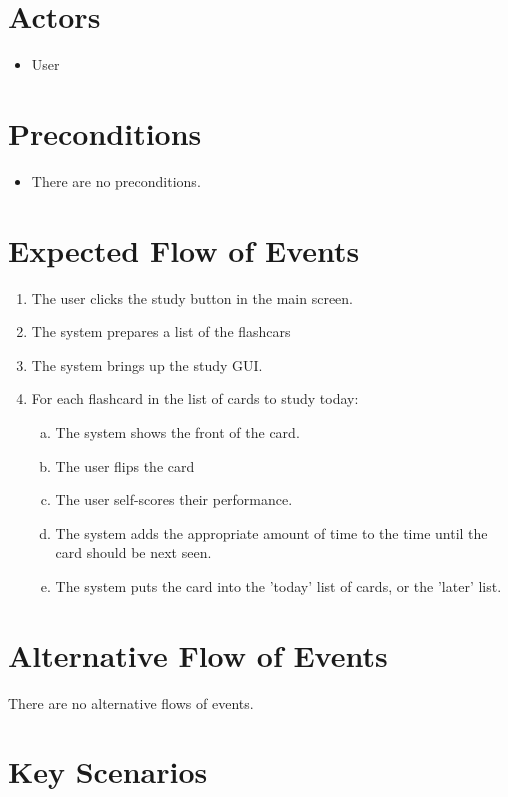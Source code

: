\documentclass{scrreprt}
\begin{document}
\section{Actors}
\begin{itemize}
    \item User
\end{itemize}

\section{Preconditions}
\begin{itemize}
    \item There are no preconditions.
\end{itemize}

\section{Expected Flow of Events}
\begin{enumerate}[1.]
    \item The user clicks the study button in the main screen.
    \item The system prepares a list of the flashcars
    \item The system brings up the study GUI.
    \item For each flashcard in the list of cards to study today:
    \begin{enumerate}[a.]
        \item The system shows the front of the card.
        \item The user flips the card
        \item The user self-scores their performance.
        \item The system adds the appropriate amount of time to the time until the card should be next seen.
        \item The system puts the card into the 'today' list of cards, or the 'later' list.
    \end{enumerate}
\end{enumerate}

\section{Alternative Flow of Events}
There are no alternative flows of events.

\section{Key Scenarios}
\end{document}
